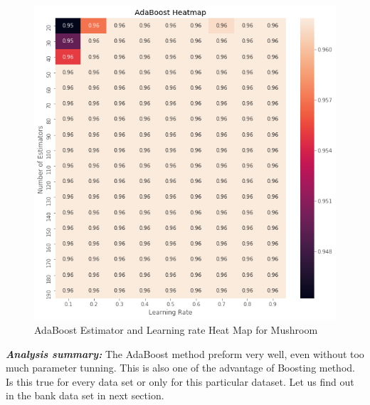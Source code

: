 \documentclass[10pt, conference, compsocconf]{IEEEtran}
\begin{document}
\begin{figure}[h]
	\centering
	\includegraphics[scale = 0.3]{image/mush_abd_heat.png}
	\caption{AdaBoost Estimator and Learning rate Heat Map for Mushroom}
	\label{fig:mush_abd_heat}
\end{figure}

\textit{\textbf{Analysis summary:}} The AdaBoost method preform very well, even without too much parameter tunning. This is also one of the advantage of Boosting method. Is this true for every data set or only for this particular dataset. Let us find out in the bank data set in next section.
\end{document}
